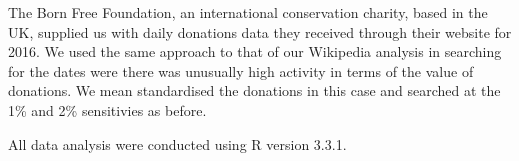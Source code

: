 \documentclass[12pt,letterpaper]{article}
\begin{document}
The Born Free Foundation, an international conservation charity, based in the UK, supplied us with daily donations data they received through their website for 2016. We used the same approach to that of our Wikipedia analysis in searching for the dates were there was unusually high activity in terms of the value of donations. We mean standardised the donations in this case and searched at the 1\% and 2\% sensitivies as before. 

All data analysis were conducted using R version 3.3.1.









%
%
\end{document}
